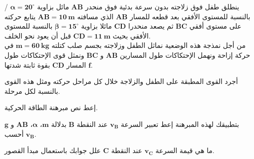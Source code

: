 \documentclass[12pt,a4paper]{article}
\begin{document}
					\begin{exercice}{}/
					ينطلق طفل فوق زلاجته بدون سرعة بدئية فوق منحدر 
$\bm{AB}$					
					مائل بزاوية 
$\bm{\alpha = 20^{\circ}}$					
					بالنسبة للمستوى الأفقي بعد قطعه للمسار 
$\bm{AB}$					
					الذي مسافته 
$\bm{AB = 10\ m}$					
					يتابع حركته على مستوى أفقي 
$\bm{BC}$					
					ثم يصعد منحدرا 
$\bm{CD}$					
					مائلا بزاوية 
$\bm{\beta = 15^{\circ}}$					
					بالنسبة للمستوى الأفقي بحيث 
$\bm{CD=11\ m}$					
					قبل أن يعود نحو الخلف.\\
					من أجل نمذجة هذه الوضعية نماثل الطفل وزلاجته بجسم صلب كتلته 
$\bm{m=60\ kg}$					
					في حركة إزاحة ونهمل الإحتكاكات طول المسارين 
$\bm{AB}$					
					و
$\bm{BC}$					
					ونمثل قوى الإحتكاكات طول المسار 
$\bm{CD}$					
					بقوة ثابتة شدتها 
$\bm{f}$.					
					\begin{enumerate}
					\begin{minipage}[c]{0.52\linewidth}
					\item أجرد القوى المطبقة على الطفل والزلاجة خلال كل مراحل حركته ومثل هذه القوى بالنسبة لكل مرحلة.
					\item إعط نص مبرهنة الطاقة الحركية.
					\item بتطبيقك لهذه المبرهنة إعط تعبير السرعة 
$\bm{v_B}$					
					عند النقطة 
$\bm{B}$					
					بدلالة 
$\bm{m}$،
$\bm{\alpha}$،
$\bm{AB}$					
					و
$\bm{g}$								
					أحسب
$\bm{v_B}$.		
\item ما هي قيمة السرعة 
$\bm{v_C}$				
					عند النقطة 
$\bm{C}$					
					علل جوابك باستعمال مبدأ القصور.				
\end{minipage}
					\begin{minipage}[c]{0.45\linewidth}
\begin{flushleft}
\begin{adjustbox}{width=\linewidth}
\end{adjustbox}
\end{flushleft}
\end{minipage}
\end{enumerate}
\end{exercice}
\end{document}
